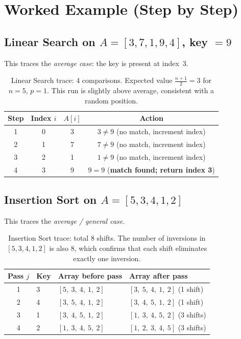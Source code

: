 \documentclass[11pt,a4paper]{article}
\begin{document}
\section{Worked Example (Step by Step)}

\subsection{Linear Search on $A=[3,7,1,9,4]$, key $=9$}
This traces the \emph{average case}: the key is present at index~3.

\begin{table}[h]
\centering
\begin{tabular}{@{}cccc@{}}
\toprule
\textbf{Step} & \textbf{Index $i$} & \textbf{$A[i]$} & \textbf{Action} \\
\midrule
1 & 0 & 3 & $3\neq 9$ (no match, increment index) \\
2 & 1 & 7 & $7\neq 9$ (no match, increment index) \\
3 & 2 & 1 & $1\neq 9$ (no match, increment index) \\
4 & 3 & 9 & $9=9$ (\textbf{match found; return index 3}) \\
\bottomrule
\end{tabular}
\caption{Linear Search trace: 4 comparisons. Expected value $\frac{n+1}{2}=3$ for
$n=5$, $p=1$. This run is slightly above average, consistent with a random position.}
\end{table}

\subsection{Insertion Sort on $A=[5,3,4,1,2]$}
This traces the \emph{average / general case}.

\begin{table}[h]
\centering
\begin{tabular}{@{}clll@{}}
\toprule
\textbf{Pass $j$} & \textbf{Key} & \textbf{Array before pass} & \textbf{Array after pass} \\
\midrule
1 & 3 & $[5,\ 3,\ 4,\ 1,\ 2]$ & $[3,\ 5,\ 4,\ 1,\ 2]$ \quad (1 shift) \\
2 & 4 & $[3,\ 5,\ 4,\ 1,\ 2]$ & $[3,\ 4,\ 5,\ 1,\ 2]$ \quad (1 shift) \\
3 & 1 & $[3,\ 4,\ 5,\ 1,\ 2]$ & $[1,\ 3,\ 4,\ 5,\ 2]$ \quad (3 shifts) \\
4 & 2 & $[1,\ 3,\ 4,\ 5,\ 2]$ & $[1,\ 2,\ 3,\ 4,\ 5]$ \quad (3 shifts) \\
\bottomrule
\end{tabular}
\caption{Insertion Sort trace: total 8 shifts. The number of inversions in
$[5,3,4,1,2]$ is also 8, which confirms that each shift eliminates exactly one inversion.}
\end{table}
\end{document}
